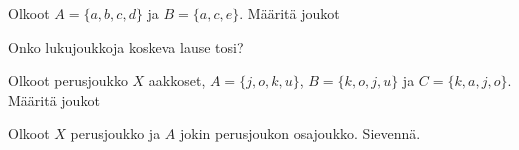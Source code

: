 \begin{tehtavasivu}
\begin{tehtava}
\end{tehtava}

\end{tehtavasivu}



\begin{kotitehtavasivu}

\begin{tehtava}
Olkoot $A = \{a, b, c, d\}$ ja $B=\{a, c, e\}$. Määritä joukot

    \begin{vastaus}
    
    \end{vastaus}
\end{tehtava}

\begin{tehtava}
Onko lukujoukkoja koskeva lause tosi?

    \begin{vastaus}
    
    \end{vastaus}
\end{tehtava}


\begin{tehtava}
Olkoot perusjoukko $X$ aakkoset, $A=\{j, o, k, u\}$, $B=\{k, o, j, u\}$ ja $C=\{k, a, j, o\}$. Määritä joukot

    \begin{vastaus}
    
    \end{vastaus}
\end{tehtava}


\begin{tehtava}
 Olkoot $X$ perusjoukko ja $A$ jokin perusjoukon osajoukko. Sievennä.


\end{tehtava}
\end{kotitehtavasivu}
